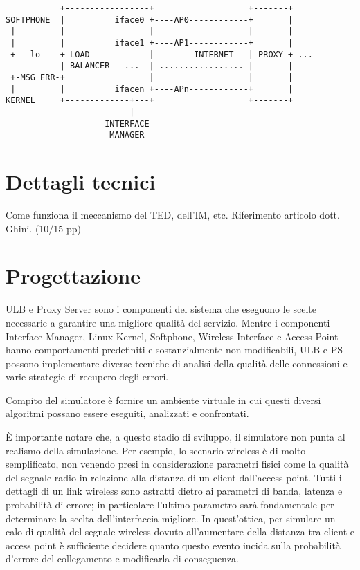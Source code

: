 \documentclass[12pt,a4paper,openright,twoside]{book}
\begin{document}
\begin{verbatim}
           +-----------------+                   +-------+
SOFTPHONE  |          iface0 +----AP0------------+       |
 |         |                 |                   |       |
 |         |          iface1 +----AP1------------+       |
 +---lo----+ LOAD            |        INTERNET   | PROXY +-...
           | BALANCER   ...  | ................. |       |
 +-MSG_ERR-+                 |                   |       |
 |         |          ifacen +----APn------------+       |
KERNEL     +-------------+---+                   +-------+
                         |
                    INTERFACE
                     MANAGER
\end{verbatim}

\chapter{Dettagli tecnici}
Come funziona il meccanismo del TED, dell'IM, etc. Riferimento
articolo dott. Ghini. (10/15 pp)

\chapter{Progettazione}
ULB e Proxy Server sono i componenti del sistema che eseguono le
scelte necessarie a garantire una migliore qualità del
servizio. Mentre i componenti Interface Manager, Linux Kernel,
Softphone, Wireless Interface e Access Point hanno comportamenti
predefiniti e sostanzialmente non modificabili, ULB e PS possono
implementare  diverse tecniche di analisi della qualità delle
connessioni e varie strategie di recupero degli errori.

Compito del simulatore è fornire un ambiente virtuale in cui questi
diversi algoritmi possano essere eseguiti, analizzati e confrontati.

È importante notare che, a questo stadio di sviluppo, il simulatore
non punta al realismo della simulazione. Per esempio, lo scenario
wireless è di molto semplificato, non venendo presi in considerazione
parametri fisici come la qualità del segnale radio in relazione alla
distanza di un client dall'access point. Tutti i dettagli di un link
wireless sono astratti dietro ai parametri di banda, latenza e
probabilità di errore; in particolare l'ultimo parametro sarà
fondamentale per determinare la scelta dell'interfaccia migliore. In
quest'ottica, per simulare un calo di qualità del segnale wireless
dovuto all'aumentare della distanza tra client e access point è
sufficiente decidere quanto questo evento incida sulla probabilità
d'errore del collegamento e modificarla di conseguenza.
\end{document}
